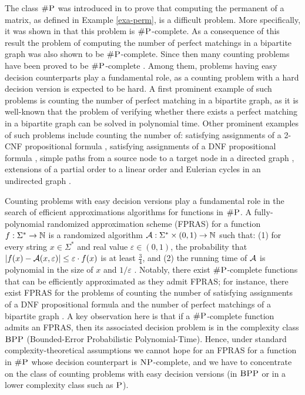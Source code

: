 
The class $\text{\sc \#P}$ was introduced in \cite{Valiant79} to prove that computing the permanent of a matrix, as defined in Example \ref{exa-perm}, is a difficult problem. More specifically, it was shown in  \cite{Valiant79}  that this problem is $\text{\sc \#P}$-complete. As a consequence of this result the problem of computing the number of perfect matchings in a bipartite graph was also shown to be $\text{\sc \#P}$-complete. Since then  many counting problems have been proved to be $\text{\sc \#P}$-complete \cite{V79b,PB83,P86,L86,BW91,HMRS98,BW05,DS12, PS13,PS14}. Among them, problems having easy decision counterparts play a fundamental role, as a counting problem with a hard decision version is expected to be hard. A first prominent example of such problems is counting the number of perfect matching in a bipartite graph, as it is well-known that the problem of verifying whether there exists a perfect matching in a bipartite graph can be solved in polynomial time. Other prominent examples of such problems include counting the number of: satisfying assignments of a 2-CNF propositional formula \cite{V79b}, satisfying assignments of a DNF propositional formula \cite{DHK05}, simple paths from a source node to a target node in a directed graph \cite{V79b}, extensions of a partial order to a linear order \cite{BW91} and Eulerian cycles in an undirected graph \cite{BW05}. 

Counting problems with easy decision versions play a fundamental role in the search of efficient approximations algorithms for functions in $\text{\sc \#P}$. A fully-polynomial randomized approximation scheme (FPRAS) for a function $f : \Sigma^* \to \mathbb{N}$ is a randomized algorithm ${\cal A} : \Sigma^* \times (0,1) \to \bbN$ such that: (1) for every string $x \in \Sigma^*$ and real value $\varepsilon \in (0,1)$, the probability that $|f(x) - {\cal A}(x,\varepsilon)| \leq \varepsilon \cdot f(x)$ is at least $\frac{3}{4}$, and (2) the running time of ${\cal A}$ is polynomial in the size of $x$ and $1/\varepsilon$ \cite{KL83}. Notably, there exist $\text{\sc \#P}$-complete functions that can be efficiently approximated as they admit FPRAS; for instance, there exist FPRAS for the problems of counting the number of satisfying assignments of a DNF propositional formula \cite{KL83} and the number of perfect matchings of a bipartite graph \cite{JSV04}. A key observation here is that if a $\text{\sc \#P}$-complete function admits an FPRAS, then its associated decision problem is in the complexity class $\text{\sc BPP}$ (Bounded-Error Probabilistic Polynomial-Time). Hence, under standard complexity-theoretical assumptions we cannot hope for an FPRAS for a function in $\text{\sc \#P}$ whose decision counterpart is $\text{\sc NP}$-complete, and we have to concentrate on the class of counting problems with easy decision versions (in $\text{\sc BPP}$ or in a lower complexity class such as $\text{\sc P}$). 

